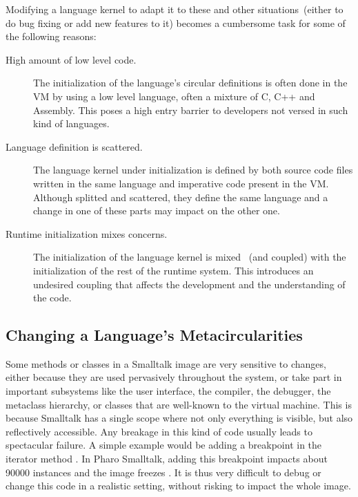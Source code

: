Modifying a language kernel to adapt it to these and other situations~(either to do bug fixing or add new features to it) becomes a cumbersome task for some of the following reasons: 
\begin{description}
\item[High amount of low level code.] The initialization of the language's circular definitions is often done in the VM by using a low level language, often a mixture of C, C++ and Assembly. This poses a high entry barrier to developers not versed in such kind of languages.
\item[Language definition is scattered.] The language kernel under initialization is defined by both source code files written in the same language and imperative code present in the VM. Although splitted and scattered, they define the same language and a change in one of these parts may impact on the other one.
\item[Runtime initialization mixes concerns.] The initialization of the language kernel is mixed ~(and coupled) with the initialization of the rest of the runtime system. This introduces an undesired coupling that affects the development and the understanding of the code.
\end{description}


\subsection{Changing a Language's Metacircularities}

Some methods or classes in a Smalltalk image are very sensitive to changes, either because they are used pervasively throughout the system, or take part in important subsystems like the user interface, the compiler, the debugger, the metaclass hierarchy, or classes that are well-known to the virtual machine.
This is because Smalltalk has a single scope where not only everything is visible, but also reflectively accessible.
Any breakage in this kind of code usually leads to spectacular failure. A simple example would be adding a breakpoint in the iterator method . In Pharo Smalltalk, adding this breakpoint impacts about 90000  instances and the image freezes \cite{Denk08b}.
It is thus very difficult to debug or change this code in a realistic setting, without risking to impact the whole image.

